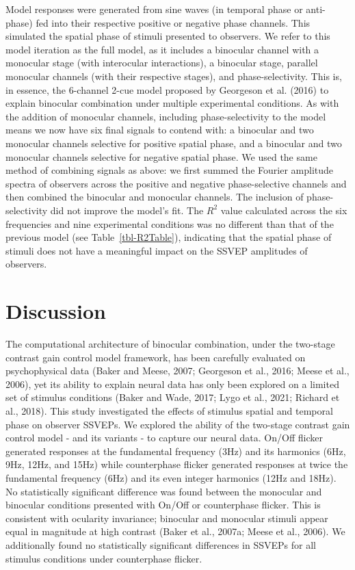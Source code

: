 \documentclass[
  12pt,
]{article}
\begin{document}
Model responses were generated from sine waves (in temporal phase or
anti-phase) fed into their respective positive or negative phase
channels. This simulated the spatial phase of stimuli presented to
observers. We refer to this model iteration as the full model, as it
includes a binocular channel with a monocular stage (with interocular
interactions), a binocular stage, parallel monocular channels (with
their respective stages), and phase-selectivity. This is, in essence,
the 6-channel 2-cue model proposed by Georgeson et al. (2016) to explain
binocular combination under multiple experimental conditions. As with
the addition of monocular channels, including phase-selectivity to the
model means we now have six final signals to contend with: a binocular
and two monocular channels selective for positive spatial phase, and a
binocular and two monocular channels selective for negative spatial
phase. We used the same method of combining signals as above: we first
summed the Fourier amplitude spectra of observers across the positive
and negative phase-selective channels and then combined the binocular
and monocular channels. The inclusion of phase-selectivity did not
improve the model's fit. The \(R^2\) value calculated across the six
frequencies and nine experimental conditions was no different than that
of the previous model (see Table~\ref{tbl-R2Table}), indicating that the
spatial phase of stimuli does not have a meaningful impact on the SSVEP
amplitudes of observers.

\section{Discussion}\label{discussion}

The computational architecture of binocular combination, under the
two-stage contrast gain control model framework, has been carefully
evaluated on psychophysical data (Baker and Meese, 2007; Georgeson et
al., 2016; Meese et al., 2006), yet its ability to explain neural data
has only been explored on a limited set of stimulus conditions (Baker
and Wade, 2017; Lygo et al., 2021; Richard et al., 2018). This study
investigated the effects of stimulus spatial and temporal phase on
observer SSVEPs. We explored the ability of the two-stage contrast gain
control model - and its variants - to capture our neural data. On/Off
flicker generated responses at the fundamental frequency (3Hz) and its
harmonics (6Hz, 9Hz, 12Hz, and 15Hz) while counterphase flicker
generated responses at twice the fundamental frequency (6Hz) and its
even integer harmonics (12Hz and 18Hz). No statistically significant
difference was found between the monocular and binocular conditions
presented with On/Off or counterphase flicker. This is consistent with
ocularity invariance; binocular and monocular stimuli appear equal in
magnitude at high contrast (Baker et al., 2007a; Meese et al., 2006). We
additionally found no statistically significant differences in SSVEPs
for all stimulus conditions under counterphase flicker.
\end{document}
